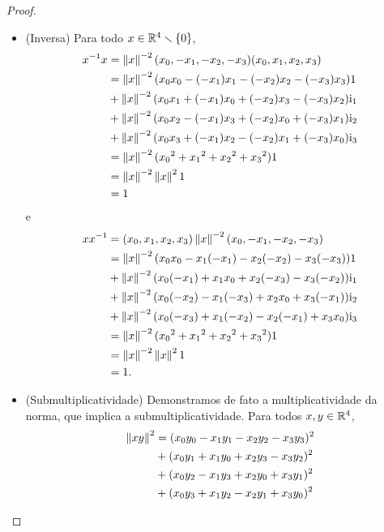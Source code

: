 \begin{proof}
\begin{itemize}
	\item (Inversa) Para todo $x \in \mathbb{R}^4 \smallsetminus \{0\}$,
		\begin{align*}
		x^{-1} x &= \left\Vert{x}\right\Vert^{-2} (x_0,-x_1,-x_2,-x_3)(x_0,x_1,x_2,x_3) \\
			&= \left\Vert{x}\right\Vert^{-2} (x_0x_0 - (-x_1)x_1 - (-x_2)x_2 - (-x_3)x_3) 1 \\
			&+ \left\Vert{x}\right\Vert^{-2} (x_0x_1 + (-x_1)x_0 + (-x_2)x_3 - (-x_3)x_2) \mathrm{i}_1 \\
			&+ \left\Vert{x}\right\Vert^{-2} (x_0x_2 - (-x_1)x_3 + (-x_2)x_0 + (-x_3)x_1) \mathrm{i}_2 \\
			&+ \left\Vert{x}\right\Vert^{-2} (x_0x_3 + (-x_1)x_2 - (-x_2)x_1 + (-x_3)x_0) \mathrm{i}_3 \\
			&= \left\Vert{x}\right\Vert^{-2} ({x_0}^2 + {x_1}^2 + {x_2}^2 + {x_3}^2) 1 \\
			&= \left\Vert{x}\right\Vert^{-2} \left\Vert{x}\right\Vert^2 1 \\
			&= 1
		\end{align*}
	e
		\begin{align*}
		x x^{-1} &= (x_0,x_1,x_2,x_3) \left\Vert{x}\right\Vert^{-2}(x_0,-x_1,-x_2,-x_3) \\
			&= \left\Vert{x}\right\Vert^{-2} (x_0x_0 - x_1(-x_1) - x_2(-x_2) - x_3(-x_3)) 1 \\
			&+ \left\Vert{x}\right\Vert^{-2} (x_0(-x_1) + x_1x_0 + x_2(-x_3) - x_3(-x_2)) \mathrm{i}_1 \\
			&+ \left\Vert{x}\right\Vert^{-2} (x_0(-x_2) - x_1(-x_3) + x_2x_0 + x_3(-x_1)) \mathrm{i}_2 \\
			&+ \left\Vert{x}\right\Vert^{-2} (x_0(-x_3) + x_1(-x_2) - x_2(-x_1) + x_3x_0) \mathrm{i}_3 \\
			&= \left\Vert{x}\right\Vert^{-2} ({x_0}^2 + {x_1}^2 + {x_2}^2 + {x_3}^2) 1 \\
			&= \left\Vert{x}\right\Vert^{-2} \left\Vert{x}\right\Vert^2 1 \\
			&= 1.
		\end{align*}
\end{itemize}
\begin{itemize}
	\item (Submultiplicatividade) Demonstramos de fato a multiplicatividade da nor\-ma, que implica a submultiplicatividade. Para todos $x,y \in \mathbb{R}^4$,
		\begin{align*}
		\nor{xy}^2 &= (x_0y_0 - x_1y_1 - x_2y_2 - x_3y_3)^2 \\
			&+ (x_0y_1 + x_1y_0 + x_2y_3 - x_3y_2)^2 \\
			&+ (x_0y_2 - x_1y_3 + x_2y_0 + x_3y_1)^2 \\
			&+ (x_0y_3 + x_1y_2 - x_2y_1 + x_3y_0)^2 \\

\end{align*}
\end{itemize}
\end{proof}
